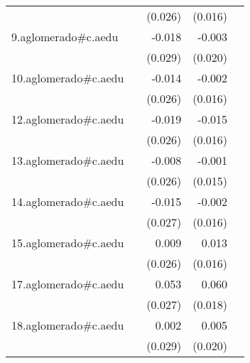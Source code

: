{\begin{longtable}{l*{4}{D{.}{.}{-1}}}
            &                     &     (0.026)         &     (0.016)         &                     \\
\addlinespace
9.aglomerado#c.aedu&                     &      -0.018         &      -0.003         &                     \\
            &                     &     (0.029)         &     (0.020)         &                     \\
\addlinespace
10.aglomerado#c.aedu&                     &      -0.014         &      -0.002         &                     \\
            &                     &     (0.026)         &     (0.016)         &                     \\
\addlinespace
12.aglomerado#c.aedu&                     &      -0.019         &      -0.015         &                     \\
            &                     &     (0.026)         &     (0.016)         &                     \\
\addlinespace
13.aglomerado#c.aedu&                     &      -0.008         &      -0.001         &                     \\
            &                     &     (0.026)         &     (0.015)         &                     \\
\addlinespace
14.aglomerado#c.aedu&                     &      -0.015         &      -0.002         &                     \\
            &                     &     (0.027)         &     (0.016)         &                     \\
\addlinespace
15.aglomerado#c.aedu&                     &       0.009         &       0.013         &                     \\
            &                     &     (0.026)         &     (0.016)         &                     \\
\addlinespace
17.aglomerado#c.aedu&                     &       0.053         &       0.060\sym{***}&                     \\
            &                     &     (0.027)         &     (0.018)         &                     \\
\addlinespace
18.aglomerado#c.aedu&                     &       0.002         &       0.005         &                     \\
            &                     &     (0.029)         &     (0.020)         &                     \\

\end{longtable}}
